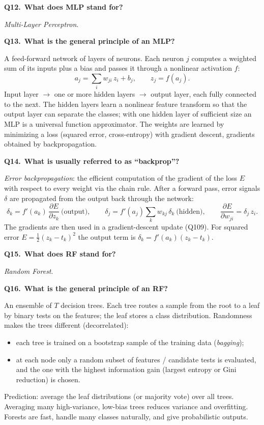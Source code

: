 \documentclass[11pt,a4paper]{article}
\newcommand{\keep}[1]{\par
  \ifdim\dimexpr\pagegoal-\pagetotal\relax<#1\relax\newpage\fi}
\newcommand{\q}[2]{\keep{2.5cm}\medskip
  {\sffamily\bfseries\color{questc}Q#1.}\ {\sffamily\bfseries #2}\par}
\begin{document}
\q{12}{What does MLP stand for?}
\emph{Multi-Layer Perceptron}.

\q{13}{What is the general principle of an MLP?}
A feed-forward network of layers of neurons. Each neuron $j$ computes a weighted
sum of its inputs plus a bias and passes it through a nonlinear activation $f$:
\[
  a_j = \sum_i w_{ji}\, z_i + b_j, \qquad z_j = f(a_j).
\]
\noindent
Input layer $\rightarrow$ one or more hidden layers $\rightarrow$ output layer,
each fully connected to the next. The hidden layers learn a nonlinear feature
transform so that the output layer can separate the classes; with one hidden
layer of sufficient size an MLP is a universal function approximator. The
weights are learned by minimizing a loss (squared error, cross-entropy) with
gradient descent, gradients obtained by backpropagation.

\q{14}{What is usually referred to as ``backprop''?}
\emph{Error backpropagation}: the efficient computation of the gradient of the
loss $E$ with respect to every weight via the chain rule. After a forward pass,
error signals $\delta$ are propagated from the output back through the network:
\[
  \delta_k = f'(a_k)\,\frac{\partial E}{\partial z_k}\ \text{(output)}, \qquad
  \delta_j = f'(a_j)\sum_k w_{kj}\,\delta_k\ \text{(hidden)}, \qquad
  \frac{\partial E}{\partial w_{ji}} = \delta_j\, z_i .
\]
\noindent
The gradients are then used in a gradient-descent update (Q109). For squared
error $E=\tfrac12(z_k-t_k)^2$ the output term is $\delta_k=f'(a_k)(z_k-t_k)$.

\q{15}{What does RF stand for?}
\emph{Random Forest}.

\q{16}{What is the general principle of an RF?}
An ensemble of $T$ decision trees. Each tree routes a sample from the root to a
leaf by binary tests on the features; the leaf stores a class distribution.
Randomness makes the trees different (decorrelated):
\begin{itemize}
  \item each tree is trained on a bootstrap sample of the training data
    (\emph{bagging});
  \item at each node only a random subset of features / candidate tests is
    evaluated, and the one with the highest information gain
    (largest entropy or Gini reduction) is chosen.
\end{itemize}
\noindent
Prediction: average the leaf distributions (or majority vote) over all trees.
Averaging many high-variance, low-bias trees reduces variance and overfitting.
Forests are fast, handle many classes naturally, and give probabilistic
outputs.
\end{document}

